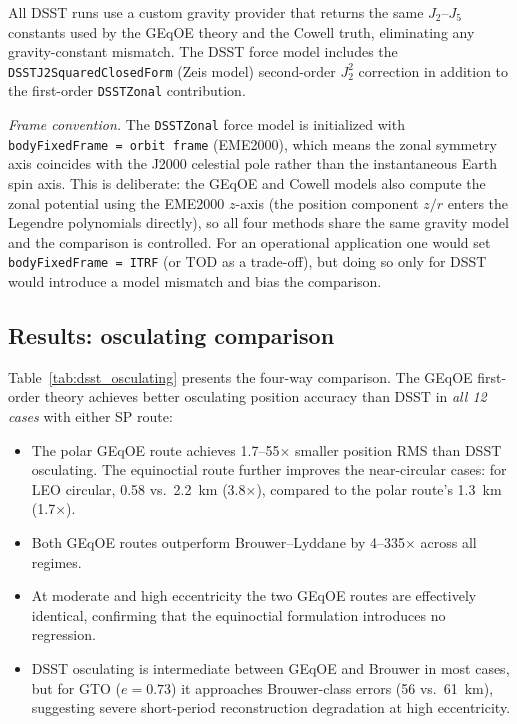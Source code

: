 \documentclass[11pt]{article}
\begin{document}
All DSST runs use a custom gravity provider that returns the same
$J_2$--$J_5$ constants used by the GEqOE theory and the Cowell truth,
eliminating any gravity-constant mismatch. The DSST force model includes
the \texttt{DSSTJ2SquaredClosedForm} (Zeis model) second-order $J_2^2$
correction in addition to the first-order \texttt{DSSTZonal}
contribution.

\emph{Frame convention.}
The \texttt{DSSTZonal} force model is initialized with
\texttt{bodyFixedFrame\,=\,orbit frame} (EME2000), which means the
zonal symmetry axis coincides with the J2000 celestial pole rather
than the instantaneous Earth spin axis.  This is deliberate: the GEqOE
and Cowell models also compute the zonal potential using the EME2000
$z$-axis (the position component $z/r$ enters the Legendre
polynomials directly), so all four methods share the same gravity model
and the comparison is controlled.  For an operational application one
would set \texttt{bodyFixedFrame\,=\,ITRF} (or TOD as a trade-off),
but doing so only for DSST would introduce a model mismatch and
bias the comparison.

\subsection{Results: osculating comparison}



Table~\ref{tab:dsst_osculating} presents the four-way comparison.  The
GEqOE first-order theory achieves better osculating position accuracy than
DSST in \emph{all 12 cases} with either SP route:

\begin{itemize}
\item The polar GEqOE route achieves 1.7--55$\times$ smaller position RMS
than DSST osculating.  The equinoctial route further improves the
near-circular cases: for LEO circular, 0.58 vs.\ 2.2~km
(3.8$\times$), compared to the polar route's 1.3~km (1.7$\times$).

\item Both GEqOE routes outperform Brouwer--Lyddane by 4--335$\times$
across all regimes.

\item At moderate and high eccentricity the two GEqOE routes are
effectively identical, confirming that the equinoctial formulation
introduces no regression.

\item DSST osculating is intermediate between GEqOE and Brouwer in most
cases, but for GTO ($e = 0.73$) it approaches Brouwer-class errors
(56 vs.\ 61~km), suggesting severe short-period reconstruction degradation
at high eccentricity.
\end{itemize}
\end{document}
